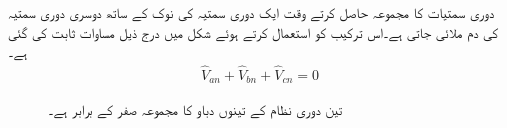 دوری سمتیات کا مجموعہ حاصل کرتے وقت ایک دوری سمتیہ کی نوک کے ساتھ دوسری دوری سمتیہ کی دم ملائی جاتی ہے۔اس ترکیب کو استعمال کرتے ہوئے شکل  میں درج ذیل مساوات ثابت کی گئی ہے۔
\begin{align}
\hat{V}_{an}+\hat{V}_{bn}+\hat{V}_{cn}=0
\end{align} 

\begin{figure}
\centering
{}
\caption{تین دوری نظام کے تینوں دباو کا مجموعہ صفر کے برابر ہے۔}
\label{شکل_تین_دوری_دباو_مجموعہ_صفر}
\end{figure}

